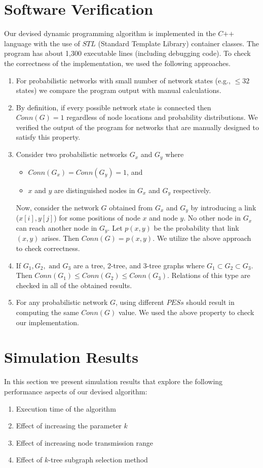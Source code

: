 \section{Software Verification}
\label{subsec:vc}
Our devised dynamic programming algorithm is implemented in the $C\mbox{++}$ language with the use of $STL$ (Standard Template Library) container classes.
The program has about 1,300 executable lines (including debugging code). To check the correctness of the implementation, we used the following approaches.
\begin{enumerate}[noitemsep]
\item For probabilistic networks with small number of network states (e.g., $\leq 32$ states) we compare the program output with manual calculations.
\item By definition, if every possible network state is connected then $Conn(G)=1$ regardless of node locations and probability distributions. We verified the output of the program for networks that are manually designed to satisfy this property.

\item Consider two probabilistic networks $G_x$ and $G_y$ where 
\begin{itemize}[noitemsep]
\item $Conn(G_x)=Conn(G_y)=1$, and
\item $x$ and $y$ are distinguished nodes in $G_x$ and $G_y$ respectively.
\end{itemize}
Now, consider the network $G$ obtained from $G_x$ and $G_y$ by introducing a link ($x[i],y[j]$) for some positions of node $x$ and node $y$. No other node in $G_x$ can reach another node in $G_y$. Let $p(x,y)$ be the probability that link $(x,y)$ arises. Then $Conn(G)=p(x,y)$. We utilize the above approach to check correctness.
\item If $G_1, G_2, \mbox{ and } G_3$ are a tree, 2-tree, and 3-tree graphs where $G_1\subset G_2\subset G_3$. Then $Conn(G_1)\leq Conn(G_2)\leq Conn(G_3)$.  Relations of this type are checked in all of the obtained results.
\item For any probabilistic network $G$, using different $PESs$ should result in computing the same $Conn(G)$ value. We used the above property to check our implementation.
\end{enumerate}
\section{Simulation Results}
In this section we present simulation results that explore the following performance aspects of our devised algorithm:
\begin{enumerate}[noitemsep]
\item Execution time of the algorithm
\item Effect of increasing the parameter $k$
\item Effect of increasing node transmission range
\item Effect of $k$-tree subgraph selection method
\end{enumerate}


